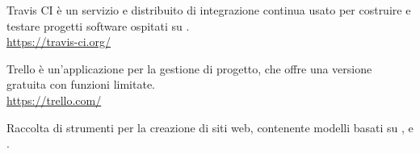 Travis CI è un servizio  e distribuito di integrazione continua usato per costruire e testare progetti software ospitati su .\\
\url{https://travis-ci.org/}

Trello è un’applicazione per la gestione di progetto, che offre una versione gratuita con funzioni limitate.\\
\url{https://trello.com/}

Raccolta di strumenti per la creazione di siti web, contenente modelli basati su ,  e .
\clearpage